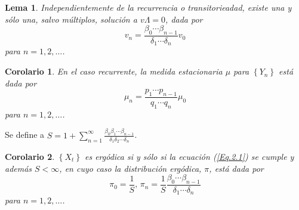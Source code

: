 \documentclass{article}
\newtheorem{Cor}{Corolario}[section]
\newtheorem{Lema}{Lema}[section]
\numberwithin{equation}{section}
\begin{document}
\begin{Lema}\label{Lema.2.2}
Independientemente de la recurrencia o transitorieadad, existe una y s\'olo una, salvo m\'ultiplos, soluci\'on a $v\Lambda=0$, dada por
\begin{equation}\label{Eq.2.2}
v_{n}=\frac{\beta_{0}\cdots\beta_{n-1}}{\delta_{1}\cdots\delta_{n}}v_{0}
\end{equation}
para $n=1,2,\ldots$.
\end{Lema}

\begin{Cor}\label{Cor.2.3}
En el caso recurrente, la medida estacionaria $\mu$ para $\left\{Y_{n}\right\}$ est\'a dada por
\begin{equation}\label{Eq.}
\mu_{n}=\frac{p_{1}\cdots p_{n-1}}{q_{1}\cdots q_{n}}\mu_{0}
\end{equation}
para $n=1,2,\ldots$.
\end{Cor}

Se define a $S=1+\sum_{n=1}^{\infty}\frac{\beta_{0}\beta_{1}\cdots\beta_{n-1}}{\delta_{1}\delta_{2}\cdots\delta_{n}}$.

\begin{Cor}\label{Cor.2.4}
$\left\{X_{t}\right\}$ es erg\'odica si y s\'olo si la ecuaci\'on (\ref{Eq.2.1}) se cumple y adem\'as $S<\infty$, en cuyo caso la distribuci\'on erg\'odica, $\pi$, est\'a dada por
\begin{equation}\label{Eq.2.4}
\pi_{0}=\frac{1}{S}\textrm{,     }\pi_{n}=\frac{1}{S}\frac{\beta_{0}\cdots\beta_{n-1}}{\delta_{1}\cdots\delta_{n}}
\end{equation}
para $n=1,2,\ldots$.
\end{Cor}






\printindex
\end{document}
